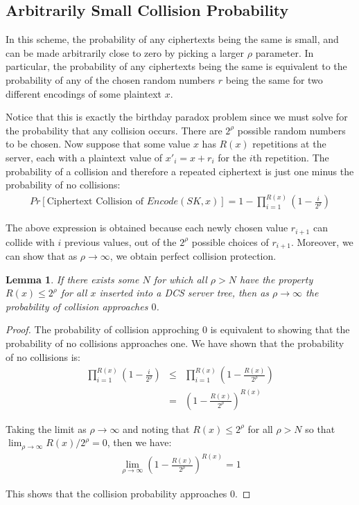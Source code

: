\documentclass[12pt]{article}
\newtheorem{lemma}{Lemma}
\begin{document}
\subsection{Arbitrarily Small Collision Probability}

In this scheme, the probability of any ciphertexts being the same is small, and can be made arbitrarily close to zero by picking a larger $\rho$ parameter. In particular, the probability of any ciphertexts being the same is equivalent to the probability of any of the chosen random numbers $r$ being the same for two different encodings of some plaintext $x$.

Notice that this is exactly the birthday paradox problem since we must solve for the probability that any collision occurs. There are $2^\rho$ possible random numbers to be chosen. Now suppose that some value $x$ has $R(x)$ repetitions at the server, each with a plaintext value of $x'_i = x + r_i$ for the $i$th repetition. The probability of a collision and therefore a repeated ciphertext is just one minus the probability of no collisions:
\begin{eqnarray}
  Pr[\textrm{Ciphertext Collision of } Encode(SK, x)] = 1 - \prod_{i=1}^{R(x)} \left(1 - \frac{i}{2^{\rho}} \right)
\end{eqnarray}

The above expression is obtained because each newly chosen value $r_{i+1}$ can collide with $i$ previous values, out of the $2^{\rho}$ possible choices of $r_{i+1}$. Moreover, we can show that as $\rho \to \infty$, we obtain perfect collision protection. \\

\begin{lemma}
  If there exists some $N$ for which all $\rho > N$ have the property $R(x) \leq 2^{\rho}$ for all $x$ inserted into a DCS server tree, then as $\rho \to \infty$ the probability of collision approaches $0$.
\end{lemma}
\begin{proof}
  The probability of collision approching 0 is equivalent to showing that the probability of no collisions approaches one. We have shown that the probability of no collisions is:
  \begin{eqnarray}
    \prod_{i=1}^{R(x)} \left(1 - \frac{i}{2^{\rho}} \right) &\leq& \prod_{i=1}^{R(x)} \left(1 - \frac{R(x)}{2^{\rho}} \right) \\
                                                    &=& \left(1 - \frac{R(x)}{2^{\rho}} \right)^{R(x)}
  \end{eqnarray}

  Taking the limit as $\rho \to \infty$ and noting that $R(x) \leq 2^{\rho}$ for all $\rho > N$ so that $\lim_{\rho \to \infty} R(x) / 2^{\rho} = 0$, then we have:
  \begin{eqnarray}
    \lim_{\rho \to \infty} \left(1 - \frac{R(x)}{2^{\rho}} \right)^{R(x)} = 1
  \end{eqnarray}

  This shows that the collision probability approaches 0.
\end{proof}
\end{document}
